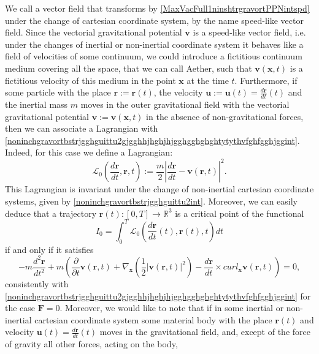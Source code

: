 \documentclass{article}
\theoremstyle{definition}
\theoremstyle{remark}
\renewcommand{\vec}[1]{\mathbf{#1}}
\newcommand{\er}{\eqref}
\newcommand{\er}{\eqref}
\begin{document}
We call a vector field that transforms by
\er{MaxVacFull1ninshtrgravortPPNintspd} under the change of
cartesian coordinate system, by the name speed-like vector field.
Since the vectorial gravitational potential $\vec v$ is a speed-like
vector field, i.e. under the changes of inertial or non-inertial
coordinate system it behaves like a field of velocities of some
continuum, we could introduce a fictitious continuum medium covering
all the space, that we can call Aether, such that $\vec v(\vec x,t)$
is a fictitious velocity of this medium in the point $\vec x$ at the
time $t$. Furthermore, if some particle with the place $\vec r:=\vec
r(t)$, the velocity $\vec u:=\vec u(t)=\frac{d\vec r}{dt}(t)$ and
the inertial mass $m$ moves in the outer gravitational field with
the vectorial gravitational potential $\vec v:=\vec v(\vec x,t)$ in
the absence of non-gravitational forces, then we can associate a
Lagrangian with
\er{noninchgravortbstrjgghguittu2gjgghhjhghjhjgghgghghghtytythvfghfgghjggint}.
Indeed, for this case we define a Lagrangian:
\begin{equation}\label{vhfffngghkjgghfjjSYSPNint}
\mathcal{L}_0\left(\frac{d\vec r}{dt},\vec
r,t\right):=\frac{m}{2}\left|\frac{d\vec r}{dt}-\vec v(\vec
r,t)\right|^2.
\end{equation}
This Lagrangian is invariant under the change of non-inertial
cartesian coordinate systems, given by
\er{noninchgravortbstrjgghguittu2int}. Moreover, we can easily
deduce that a trajectory $\vec r(t):[0,T]\to\mathbb{R}^3$ is a
critical point of the functional
\begin{equation}\label{btfffygtgyggyijhhkkSYSPNint}
I_0=\int_0^T \mathcal{L}_0\left(\frac{d\vec r}{dt}(t),\vec
r(t),t\right)dt
\end{equation}
if and only if it satisfies
\begin{equation}\label{vhfffngghkjgghggtghjgfhjoyuiyuyhiyyukukyihyuSYSPNint}
-m\frac{d^2\vec r}{dt^2}+m\left(\frac{\partial}{\partial t}\vec
v(\vec r,t)+\nabla_{\vec x}\left(\frac{1}{2}\left|\vec v(\vec
r,t)\right|^2\right)-\frac{d\vec r}{dt}\times curl_{\vec x}\vec
v\left(\vec r,t\right)\right)=0,
\end{equation}
consistently with
\er{noninchgravortbstrjgghguittu2gjgghhjhghjhjgghgghghghtytythvfghfgghjggint}
for the case $\vec F=0$. Moreover, we would like to note that if in
some inertial or non-inertial cartesian coordinate system some
material body with the place $\vec r(t)$ and velocity $\vec
u(t)=\frac{d\vec r}{dt}(t)$ moves in the gravitational field, and,
except of the force of gravity all other forces, acting on the body,
\end{document}
